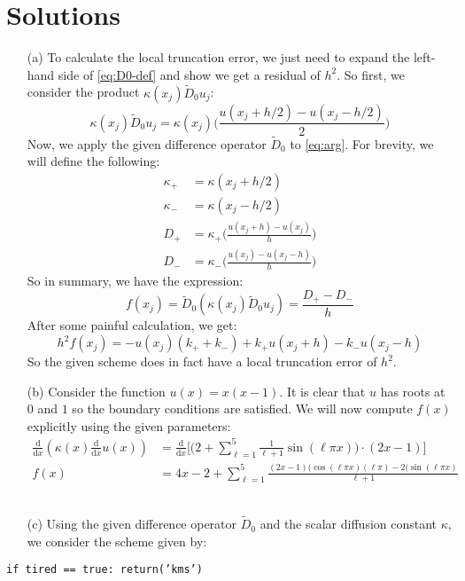 \documentclass[11pt,reqno]{amsart}
\newcommand{\mathd}{\textrm{d}}
\newcommand{\ddx}[1]{\frac{\mathd}{\mathd #1}}
\newcommand{\code}{\texttt}
\begin{document}
\section*{\textbf{Solutions}}
\begin{itemize}
    \item[(a)] To calculate the local truncation error, we just need to expand the left-hand side of \eqref{eq:D0-def} and show we get a residual of $h^2$. So first, we consider the product $\kappa(x_j)\widetilde{D}_0u_j$:
    \begin{equation}\label{eq:arg}
        \kappa(x_j)\widetilde{D}_0u_j = \kappa(x_j)\bigg( \frac{u(x_j + h/2)-u(x_j -h/2)}{2}\bigg)
    \end{equation}
    Now, we apply the given difference operator $\widetilde{D}_0$ to \eqref{eq:arg}. For brevity, we will define the following:
    \begin{align*}
        \kappa_+ &= \kappa(x_j + h/2)\\
        \kappa_- &= \kappa(x_j - h/2)\\
        D_+ &= \kappa_+ \bigg( \frac{u(x_j + h) -u (x_j)}{h}\bigg)\\
        D_- &= \kappa_- \bigg( \frac{u(x_j) - u(x_j - h)}{h}\bigg)
    \end{align*}
    So in summary, we have the expression:
    \begin{equation}
        f(x_j) = \widetilde{D}_0 \left( \kappa(x_j) \widetilde{D}_0 u_j \right) = \frac{D_+ - D_-}{h}
    \end{equation}
    After some painful calculation, we get:
    \begin{equation*}
        h^2f(x_j) = -u(x_j)(k_+ + k_-) + k_+u(x_j + h) - k_-u(x_j-h)
    \end{equation*}
    So the given scheme does in fact have a local truncation error of $h^2$.\newline
    \\
    \item[(b)] Consider the function $u(x) = x(x-1)$. It is clear that $u$ has roots at $0$ and $1$ so the boundary conditions are satisfied. We will now compute $f(x)$ explicitly using the given parameters:
    \\
    \begin{align*}
            \ddx{x} \left(\kappa(x) \ddx{x} u(x) \right) &=  \ddx{x} \bigg[\bigg(2 + \sum_{\ell=1}^{5} \frac{1}{\ell+1} \sin( \ell \pi x )\bigg) \cdot (2x-1) \bigg]\\
           f(x) &= 4x -2 +\sum_{\ell=1}^5 \frac{(2x-1)(\cos(\ell \pi x)(\ell \pi)-2(\sin(\ell \pi x)}{\ell + 1}
    \end{align*}\newline
    \\
    \item[(c)] Using the given difference operator $\widetilde{D}_0$ and the scalar diffusion constant $\kappa$, we consider the scheme given by:
\end{itemize}
\code{if tired == true: return('kms')}
\end{document}
